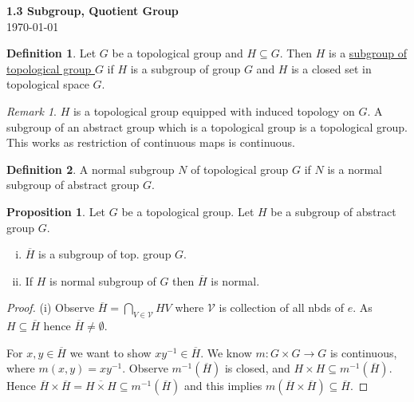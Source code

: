 \documentclass[11pt]{article}
\theoremstyle{definition}
\newtheorem{definition}{Definition}[section]
\newtheorem{proposition}{Proposition}[section]
\theoremstyle{remark}
\newtheorem{remark}{Remark}[section]
\begin{document}
\begin{center}
{\Large\textbf{1.3 Subgroup, Quotient Group}}\\
\vspace{0.3cm}
{\normalsize\today}
\end{center}
\vspace{0.5cm}

\begin{definition}\label{def:subgroup_topological_group}
Let $G$ be a topological group and $H \subseteq G$. Then $H$ is a \underline{subgroup of topological group $G$} if $H$ is a subgroup of group $G$ and $H$ is a closed set in topological space $G$.
\end{definition}

\begin{remark}\label{rem:induced_topology_subgroup}
$H$ is a topological group equipped with induced topology on $G$. A subgroup of an abstract group which is a topological group is a topological group. This works as restriction of continuous maps is continuous.
\end{remark}

\begin{definition}\label{def:normal_subgroup_topological_group}
A normal subgroup $N$ of topological group $G$ if $N$ is a normal subgroup of abstract group $G$.
\end{definition}

\begin{proposition}\label{prop:closure_subgroup}
Let $G$ be a topological group. Let $H$ be a subgroup of abstract group $G$.
\begin{enumerate}[(i)]
\item $\overline{H}$ is a subgroup of top. group $G$.
\item If $H$ is normal subgroup of $G$ then $\overline{H}$ is normal.
\end{enumerate}
\end{proposition}

\begin{proof}
(i) Observe $\overline{H} = \bigcap_{V \in \mathcal{V}} HV$ where $\mathcal{V}$ is collection of all nbds of $e$. As $H \subseteq \overline{H}$ hence $\overline{H} \neq \emptyset$.

For $x, y \in \overline{H}$ we want to show $xy^{-1} \in \overline{H}$. We know $m: G \times G \to G$ is continuous, where $m(x,y) = xy^{-1}$. Observe $m^{-1}(\overline{H})$ is closed, and $H \times H \subseteq m^{-1}(\overline{H})$. Hence $\overline{H} \times \overline{H} = \overline{H \times H} \subseteq m^{-1}(\overline{H})$ and this implies $m(\overline{H} \times \overline{H}) \subseteq \overline{H}$.
\end{proof}
\end{document}

